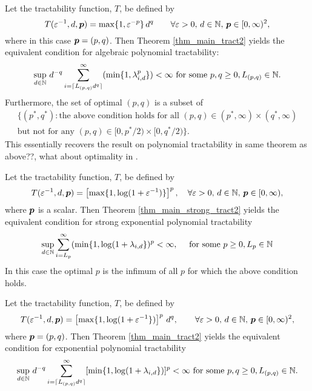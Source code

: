 \documentclass[11pt,a4paper]{article}
\newcommand{\fred}[1]{\begingroup\color{blue}#1\endgroup}
\begin{document}
\begin{example}
Let the tractability function, $T$,
be defined by
\[
 T(\varepsilon^{-1},d,\boldsymbol{p})= \max\{1,\varepsilon^{-p}\}\, d^q
 \qquad \forall \varepsilon > 0, \,  d \in \mathbb{N}, \, \boldsymbol{p} \in [0,\infty)^2, 
\] where in this case $\boldsymbol{p} = (p,q)$.
Then Theorem \ref{thm_main_tract2} yields the  equivalent condition for algebraic polynomial tractability:
\[
 \sup_{d\in\mathbb{N}}\, d^{-q} \sum_{i=\lceil L_{(p,q)} d^{q}\rceil}^\infty (\min\{1,\lambda_{i,d}^p\})  < \infty \text{ for some } p,q \ge 0, L_{(p,q)} \in \mathbb{N}.
\]
Furthermore, the set of optimal $(p,q)$ is a subset of
\begin{multline*}
\{(p^*,q^*) : \text{the above condition holds for all }(p,q) \in (p^*,\infty) \times (q^*,\infty) \\
\text{but not for any }(p,q) \in [0,p^*/2) \times [0,q^*/2)\}.
\end{multline*}
This essentially recovers the result on polynomial tractability in \cite[Theorem 5.1]{NW08} \fred{same theorem as above??, what about optimality in \cite[Theorem 5.1]{NW08}}.
\end{example}


\begin{example}
Let the tractability function, $T$,
be defined by
\[
 T(\varepsilon^{-1},d,\boldsymbol{p})= \left[\max\{1,\log(1+\varepsilon^{-1})\}\right]^p, \quad \forall \varepsilon > 0, \,  d \in \mathbb{N}, \, \boldsymbol{p} \in [0,\infty),
\]
where $\boldsymbol{p}$ is a scalar. Then Theorem \ref{thm_main_strong_tract2} yields the equivalent condition for strong exponential polynomial tractability \[
 \sup_{d\in\mathbb{N}} \sum_{i=L_{p} }^\infty (\min\{1,\log(1+\lambda_{i,d}\})^{p}  < \infty,\quad  \text{ for some } p \ge 0, L_{p} \in \mathbb{N}
\] In this case the optimal $p$ is the infimum of all $p$ for which the above condition holds.
\end{example}
\begin{example}
Let the tractability function, $T$,
be defined by
\[
 T(\varepsilon^{-1},d,\boldsymbol{p})=\left[\max\{1,\log(1+\varepsilon^{-1}\})\right]^p\, d^q, \qquad \forall \varepsilon > 0, \,  d \in \mathbb{N}, \, \boldsymbol{p} \in [0,\infty)^2, 
\] where $\boldsymbol{p} = (p,q)$. Then Theorem \ref{thm_main_tract2} yields  the equivalent condition for exponential polynomial tractability
\[
 \sup_{d\in\mathbb{N}}\, d^{-q} \sum_{i=\lceil L_{(p,q)} d^{q}\rceil}^\infty [\min\{1,\log(1+\lambda_{i,d}\})]^p < \infty  \text{ for some } p,q \ge 0, L_{(p,q)} \in \mathbb{N}.
\]
\end{example}
\end{document}
